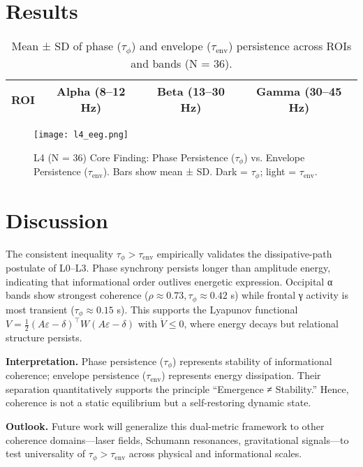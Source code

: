 \documentclass[12pt,a4paper]{article}
\begin{document}
\section{Results}
\begin{table}[h!]
\centering
\caption{Mean ± SD of phase (\(\tau_\phi\)) and envelope (\(\tau_{\mathrm{env}}\)) persistence across ROIs and bands (N = 36).}
\begin{tabular}{lccc}
\toprule
ROI & Alpha (8–12 Hz) & Beta (13–30 Hz) & Gamma (30–45 Hz)\\
\midrule

\bottomrule
\end{tabular}
\end{table}

\begin{figure}[h!]
\centering
\texttt{[image: l4\_eeg.png]}
\caption{L4 (N = 36) Core Finding: Phase Persistence (\(\tau_\phi\)) vs. Envelope Persistence (\(\tau_{\mathrm{env}}\)).
Bars show mean ± SD. Dark = \(\tau_\phi\); light = \(\tau_{\mathrm{env}}\).}
\label{fig:l4bar}
\end{figure}

\section{Discussion}
The consistent inequality \(\tau_\phi>\tau_{\mathrm{env}}\) empirically validates the dissipative-path postulate of L0–L3.  
Phase synchrony persists longer than amplitude energy, indicating that informational order outlives energetic expression.  
Occipital α bands show strongest coherence (\(\rho\approx0.73, \tau_\phi\approx0.42\) s) while frontal γ activity is most transient (\(\tau_\phi\approx0.15\) s).  
This supports the Lyapunov functional \(V=\frac12(A\varepsilon-\delta)^{\!\top}W(A\varepsilon-\delta)\) with \(\dot V\le0\), where energy decays but relational structure persists.

\textbf{Interpretation.}  
Phase persistence (\(\tau_\phi\)) represents stability of informational coherence; envelope persistence (\(\tau_{\mathrm{env}}\)) represents energy dissipation.  
Their separation quantitatively supports the principle “Emergence ≠ Stability.”  
Hence, coherence is not a static equilibrium but a self-restoring dynamic state.

\textbf{Outlook.}  
Future work will generalize this dual-metric framework to other coherence domains—laser fields, Schumann resonances, gravitational signals—to test universality of \(\tau_\phi>\tau_{\mathrm{env}}\) across physical and informational scales.
\end{document}
